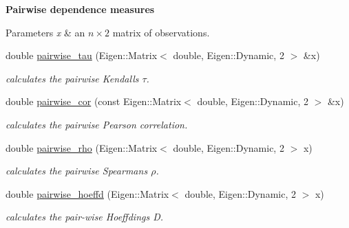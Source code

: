 \begin{Indent}{\bf Pairwise dependence measures}\par
{\em 
\begin{DoxyParams}{Parameters}
{\em x} & an $ n \times 2 $ matrix of observations. \\
\hline
\end{DoxyParams}
}\begin{DoxyCompactItemize}
\item 
double \hyperlink{namespacevinecopulib_1_1tools__stats_a48d674c978d8a9b657b3ab82ed42de4b}{pairwise\+\_\+tau} (Eigen\+::\+Matrix$<$ double, Eigen\+::\+Dynamic, 2 $>$ \&x)\hypertarget{namespacevinecopulib_1_1tools__stats_a48d674c978d8a9b657b3ab82ed42de4b}{}\label{namespacevinecopulib_1_1tools__stats_a48d674c978d8a9b657b3ab82ed42de4b}

\begin{DoxyCompactList}\small\item\em calculates the pairwise Kendall\textquotesingle{}s $ \tau $. \end{DoxyCompactList}\item 
double \hyperlink{namespacevinecopulib_1_1tools__stats_ad076513f9a531a015bb0eaff098a8271}{pairwise\+\_\+cor} (const Eigen\+::\+Matrix$<$ double, Eigen\+::\+Dynamic, 2 $>$ \&x)\hypertarget{namespacevinecopulib_1_1tools__stats_ad076513f9a531a015bb0eaff098a8271}{}\label{namespacevinecopulib_1_1tools__stats_ad076513f9a531a015bb0eaff098a8271}

\begin{DoxyCompactList}\small\item\em calculates the pairwise Pearson correlation. \end{DoxyCompactList}\item 
double \hyperlink{namespacevinecopulib_1_1tools__stats_af45a0930d65c0392e35deab25f687711}{pairwise\+\_\+rho} (Eigen\+::\+Matrix$<$ double, Eigen\+::\+Dynamic, 2 $>$ x)\hypertarget{namespacevinecopulib_1_1tools__stats_af45a0930d65c0392e35deab25f687711}{}\label{namespacevinecopulib_1_1tools__stats_af45a0930d65c0392e35deab25f687711}

\begin{DoxyCompactList}\small\item\em calculates the pairwise Spearman\textquotesingle{}s $ \rho $. \end{DoxyCompactList}\item 
double \hyperlink{namespacevinecopulib_1_1tools__stats_adda97526e428173da49899ef449560cf}{pairwise\+\_\+hoeffd} (Eigen\+::\+Matrix$<$ double, Eigen\+::\+Dynamic, 2 $>$ x)\hypertarget{namespacevinecopulib_1_1tools__stats_adda97526e428173da49899ef449560cf}{}\label{namespacevinecopulib_1_1tools__stats_adda97526e428173da49899ef449560cf}

\begin{DoxyCompactList}\small\item\em calculates the pair-\/wise Hoeffding\textquotesingle{}s D. \end{DoxyCompactList}\end{DoxyCompactItemize}
\end{Indent}


